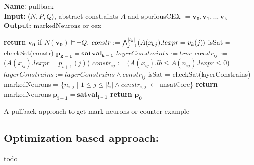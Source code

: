\begin{algorithm}[t]
  \textbf{Name: } pullback \\
  \textbf{Input: } $\langle N,P,Q \rangle$, abstract constraints $A$ and spuriousCEX $=\boldsymbol{v_0}, \boldsymbol{v_1}, .., \boldsymbol{v_k}$ \\
  \textbf{Output: } markedNeurons or cex. 
  \begin{algorithmic}[1]
   \State \textbf{return} $\boldsymbol{v_0}$ if $N(\boldsymbol{v_0}) \models \neg Q$. 
   \State $constr := \bigwedge_{j=1}^{|l_k|} (A(x_{kj}).lexpr = v_k(j))$
   \State isSat = checkSat(constr)
    
      \State $\boldsymbol{p_{k-1}} = \boldsymbol{satval_{k-1}}$ 
   \EndIf
        \State $layerConstraints := true$
            \State $constr_{ij}$ := $(A(x_{ij}).lexpr = p_{i+1}(j)$) 
          \Else
            \State $constr_{ij}$ := $(A(x_{ij}).lb \leq A(n_{ij}).lexpr \leq 0$)
          \EndIf
          \State $layerConstrains := layerConstrains \land constr_{ij}$
        \EndFor
        \State isSat = checkSat(layerConstrains)
          \State markedNeurons = \{$n_{i,j}$ | $1 \leq j\leq |l_i| \land constr_{i,j}$ $\in$ unsatCore\}
          \State \textbf{return } markedNeurons
        \Else
          \State $\boldsymbol{p_{i-1}} = \boldsymbol{satval_{i-1}}$
        \EndIf
      \EndIf
   \EndFor
    \State \textbf{return} $\boldsymbol{p_0}$ 
  \end{algorithmic}
  \caption{A pullback approach to get mark neurons or counter example}
  \label{algo:refine1}
\end{algorithm}

\subsection{Optimization based approach: }

todo

